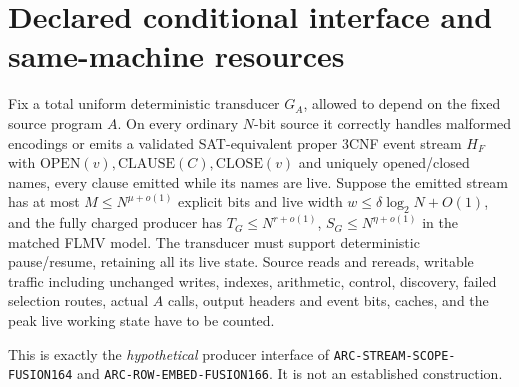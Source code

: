 \documentclass[11pt]{article}
\begin{document}
\section{Declared conditional interface and same-machine resources}
Fix a total uniform deterministic transducer $G_A$, allowed to depend on
the fixed source program $A$. On every ordinary $N$-bit source it correctly
handles malformed encodings or emits a validated SAT-equivalent proper
3CNF event stream $H_F$ with
$\mathrm{OPEN}(v),\mathrm{CLAUSE}(C),\mathrm{CLOSE}(v)$ and uniquely
opened/closed names, every clause emitted while its names are live.
Suppose the emitted stream has at most $M\le N^{\mu+o(1)}$ explicit bits
and live width $w\le\delta\log_2N+O(1)$, and the fully charged producer
has $T_G\le N^{r+o(1)}$, $S_G\le N^{\eta+o(1)}$ in the matched FLMV
model. The transducer must support deterministic pause/resume, retaining
all its live state. Source reads and rereads, writable traffic including
unchanged writes, indexes, arithmetic, control, discovery, failed
selection routes, actual $A$ calls, output headers and event bits, caches,
and the peak live working state have to be counted.

This is exactly the \emph{hypothetical} producer interface of
\texttt{ARC-STREAM-SCOPE-FUSION164} and
\texttt{ARC-ROW-EMBED-FUSION166}. It is not an established construction.
\end{document}
